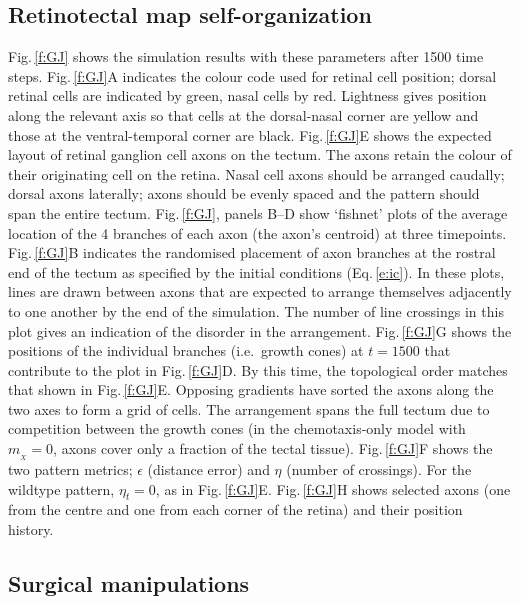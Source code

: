 \documentclass[9pt]{elife} %
\begin{document}
\subsection*{Retinotectal map self-organization}

Fig.\,\ref{f:GJ} shows the simulation results with these parameters after 1500 time steps.
Fig.\,\ref{f:GJ}A indicates the colour code used for retinal cell position; dorsal retinal cells are indicated by green, nasal cells by red. Lightness gives position along the relevant axis so that cells at the dorsal-nasal corner are yellow and those at the ventral-temporal corner are black.
Fig.\,\ref{f:GJ}E shows the expected layout of retinal ganglion cell axons on the tectum.
The axons retain the colour of their originating cell on the retina.
Nasal cell axons should be arranged caudally; dorsal axons laterally; axons should be evenly spaced and the pattern should span the entire tectum.
Fig.\,\ref{f:GJ}, panels B--D show `fishnet' plots of the average location of the 4 branches of each axon (the axon's centroid) at three timepoints.
Fig.\,\ref{f:GJ}B indicates the randomised placement of axon branches at the rostral end of the tectum as specified by the initial conditions (Eq.\,\ref{e:ic}).
In these plots, lines are drawn between axons that are expected to arrange themselves adjacently to one another by the end of the simulation.
The number of line crossings in this plot gives an indication of the disorder in the arrangement.
Fig.\,\ref{f:GJ}G shows the positions of the individual branches (i.e.~growth cones) at $t=1500$ that contribute to the plot in Fig.\,\ref{f:GJ}D.
By this time, the topological order matches that shown in Fig.\,\ref{f:GJ}E.
Opposing gradients have sorted the axons along the two axes to form a grid of cells.
The arrangement spans the full tectum due to competition between the growth cones (in the chemotaxis-only model with $m_{\!_X}=0$, axons cover only a fraction of the tectal tissue).
Fig.\,\ref{f:GJ}F shows the two pattern metrics; $\epsilon$ (distance error) and $\eta$ (number of crossings).
For the wildtype pattern, $\eta_t=0$, as in Fig.\,\ref{f:GJ}E.
Fig.\,\ref{f:GJ}H shows selected axons (one from the centre and one from each corner of the retina) and their position history.

\subsection*{Surgical manipulations}
\end{document}
